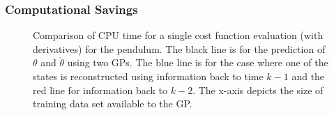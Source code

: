 \subsubsection{Computational Savings}


\begin{figure}[t!]
\centering \small
{}
\caption{Comparison of CPU time for a single cost function evaluation (with derivatives) for the pendulum. The black line is for the prediction of $\theta$ and $\dot\theta$ using two GPs. The blue line is for the case where one of the states is reconstructed using information back to time $k-1$ and the red line for information back to $k-2$. The x-axis depicts the size of training data set available to the GP.}
\label{fig:pencomps}
\end{figure}



